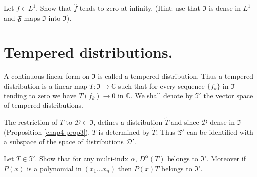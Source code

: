 \begin{exer*}
Let $f\in L^{1}$. Show that $\widehat{f}$ tends to zero at
infinity. (Hint: use that $\mathfrak{I}$ is dense in $L^{1}$ and
$\mathfrak{F}$ maps $\mathfrak{I}$ into $\mathfrak{I}$).
\end{exer*}

\section*{Tempered distributions.}

A continuous linear form on $\mathfrak{I}$ is called a tempered
distribution. Thus a tempered distribution is a linear map
$T:\mathfrak{I}\to \mathbb{C}$ such that for every sequence
$\{f_{k}\}$ in $\mathfrak{I}$ tending to zero we have\pageoriginale
$T(f_{k})\to 0$ in $\mathbb{C}$. We shall denote by $\mathfrak{I}'$
the vector space of tempered distributions.

The restriction of $T$ to $\mathcal{D}\subset \mathfrak{I}$, defines a
distribution $\widetilde{T}$ and since $\mathcal{D}$ dense in
$\mathfrak{I}$ (Proposition \ref{chap4-prop3}). $T$ is determined by
$\widetilde{T}$. Thus $\mathfrak{T}'$ can be identified with a
subspace of the space of distributions $\mathcal{D}'$.

\begin{exer*}
Let $T\in \mathfrak{I}'$. Show that for any multi-indx $\alpha$,
$D^{\alpha}(T)$ belongs to $\mathfrak{I}'$. Moreover if $P(x)$ is a
polynomial in $(x_{1}\ldots x_{n})$ then $P(x)T$ belongs to $\mathfrak{I}'$.
\end{exer*}

